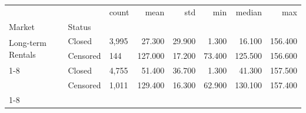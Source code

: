 \begin{tabular}{lllrrrrr}
\toprule
 &  & count & mean & std & min & median & max \\
Market & Status &  &  &  &  &  &  \\
\midrule
\multirow[t]{2}{*}{Long-term Rentals} & Closed & 3,995 & 27.300 & 29.900 & 1.300 & 16.100 & 156.400 \\
 & Censored & 144 & 127.000 & 17.200 & 73.400 & 125.500 & 156.600 \\
\cline{1-8}
\multirow[t]{2}{*}{Secondary Sales} & Closed & 4,755 & 51.400 & 36.700 & 1.300 & 41.300 & 157.500 \\
 & Censored & 1,011 & 129.400 & 16.300 & 62.900 & 130.100 & 157.400 \\
\cline{1-8}
\bottomrule
\end{tabular}
